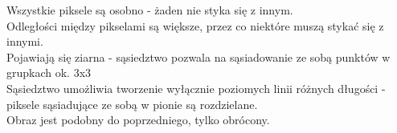 Wszystkie piksele są osobno - żaden nie styka się z innym.\\
Odległości między pikselami są większe, przez co niektóre muszą stykać się z innymi.\\ 
Pojawiają się ziarna - sąsiedztwo pozwala na sąsiadowanie ze sobą punktów w grupkach ok. 3x3\\
Sąsiedztwo umożliwia tworzenie wyłącznie poziomych linii różnych długości - piksele sąsiadujące ze sobą w pionie są rozdzielane.\\
Obraz jest podobny do poprzedniego, tylko obrócony.\\


